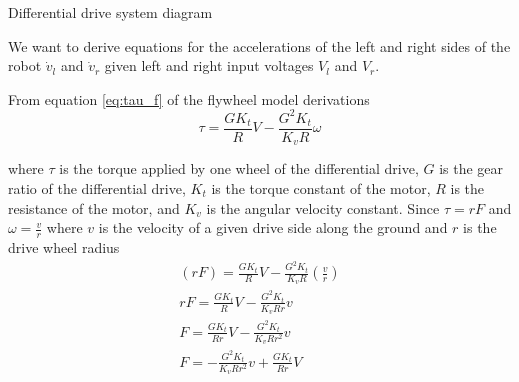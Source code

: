 \begin{bookfigure}

  \caption{Differential drive system diagram}
\end{bookfigure}

We want to derive equations for the accelerations of the left and right sides of
the robot $\dot{v}_l$ and $\dot{v}_r$ given left and right input voltages $V_l$
and $V_r$.

From equation \eqref{eq:tau_f} of the flywheel \gls{model} derivations
\begin{equation}
  \tau = \frac{GK_t}{R} V - \frac{G^2K_t}{K_v R} \omega
\end{equation}

where $\tau$ is the torque applied by one wheel of the differential drive, $G$
is the gear ratio of the differential drive, $K_t$ is the torque constant of the
motor, $R$ is the resistance of the motor, and $K_v$ is the angular velocity
constant. Since $\tau = rF$ and $\omega = \frac{v}{r}$ where $v$ is the velocity
of a given drive side along the ground and $r$ is the drive wheel radius
\begin{align*}
  (rF) = \frac{GK_t}{R} V - \frac{G^2K_t}{K_v R} \left(\frac{v}{r}\right) \\
  rF = \frac{GK_t}{R} V - \frac{G^2K_t}{K_v Rr} v \\
  F = \frac{GK_t}{Rr} V - \frac{G^2K_t}{K_v Rr^2} v \\
  F = -\frac{G^2K_t}{K_v Rr^2} v + \frac{GK_t}{Rr} V
\end{align*}

